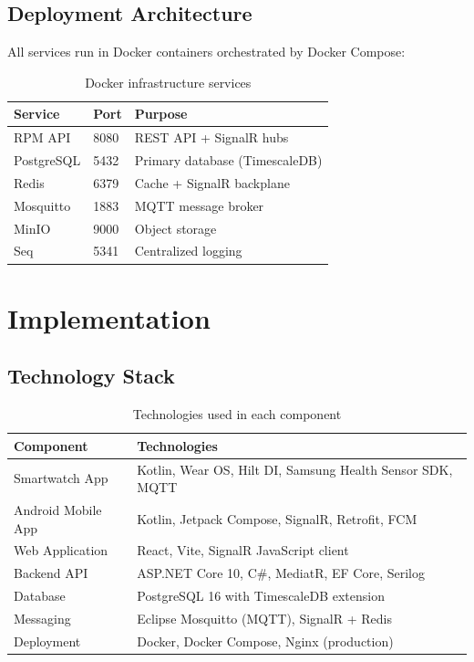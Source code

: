 \documentclass[12pt,a4paper]{report}
\begin{document}
\section{Deployment Architecture}

All services run in Docker containers orchestrated by Docker Compose:

\begin{table}[H]
  \centering
  \caption{Docker infrastructure services}
  \label{tab:docker}
  \begin{tabular}{@{}llp{5.5cm}@{}}
    \toprule
    \textbf{Service} & \textbf{Port} & \textbf{Purpose} \\
    \midrule
    RPM API          & 8080  & REST API + SignalR hubs \\
    PostgreSQL       & 5432  & Primary database (TimescaleDB) \\
    Redis            & 6379  & Cache + SignalR backplane \\
    Mosquitto        & 1883  & MQTT message broker \\
    MinIO            & 9000  & Object storage \\
    Seq              & 5341  & Centralized logging \\
    \bottomrule
  \end{tabular}
\end{table}

\chapter{Implementation}
\label{ch:implementation}

\section{Technology Stack}

\begin{table}[H]
  \centering
  \caption{Technologies used in each component}
  \label{tab:tech}
  \begin{tabular}{@{}ll@{}}
    \toprule
    \textbf{Component} & \textbf{Technologies} \\
    \midrule
    Smartwatch App     & Kotlin, Wear OS, Hilt DI, Samsung Health Sensor SDK, MQTT \\
    Android Mobile App & Kotlin, Jetpack Compose, SignalR, Retrofit, FCM \\
    Web Application    & React, Vite, SignalR JavaScript client \\
    Backend API        & ASP.NET Core 10, C\#, MediatR, EF Core, Serilog \\
    Database           & PostgreSQL 16 with TimescaleDB extension \\
    Messaging          & Eclipse Mosquitto (MQTT), SignalR + Redis \\
    Deployment         & Docker, Docker Compose, Nginx (production) \\
    \bottomrule
  \end{tabular}
\end{table}
\end{document}

